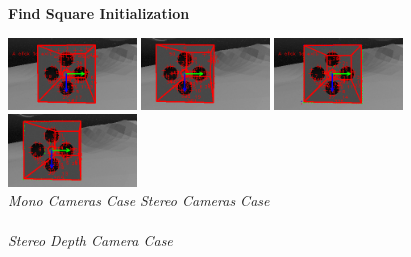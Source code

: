 \vspace{-12px}
\begin{figure}[H]
	\begin{center}
		 \textbf{Find Square Initialization}
	\end{center}
	\vspace{-10px}
	\includegraphics[width=3.4cm]{tracking/square/mono_left.png}
	\includegraphics[width=3.4cm]{tracking/square/mono_right.png}
	\hspace{10px}
	\includegraphics[width=3.4cm]{tracking/square/stereo_left.png}
	\includegraphics[width=3.4cm]{tracking/square/stereo_right.png}\\
	{\footnotesize \hspace*{20px}\textit{Mono Cameras Case} \hspace{120px} \textit{Stereo Cameras Case}}\\
	\\
    {\footnotesize \textit{Stereo Depth Camera Case}}\\  
\end{figure}
